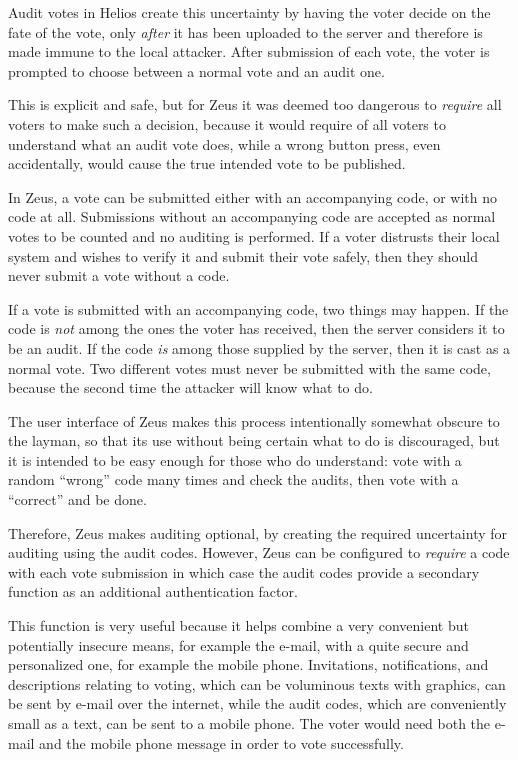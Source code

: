 \documentclass[letterpaper,10pt]{article}
\begin{document}
Audit votes in Helios create this uncertainty by having the voter decide
on the fate of the vote, only \emph{after} it has been uploaded to the
server and therefore is made immune to the local attacker.
After submission of each vote, the voter is prompted to choose
between a normal vote and an audit one.

This is explicit and safe, but for Zeus it was deemed too dangerous to
\emph{require} all voters to make such a decision, because it would
require of all voters to understand what an audit vote does,
while a wrong button press, even accidentally,
would cause the true intended vote to be published.

In Zeus, a vote can be submitted either with an accompanying code,
or with no code at all.
Submissions without an accompanying code are accepted
as normal votes to be counted and no auditing is performed.
If a voter distrusts their local system and wishes to verify it
and submit their vote safely, then they should never submit
a vote without a code.

If a vote is submitted with an accompanying code, two things may happen.
If the code is \emph{not} among the ones the voter has received, then
the server considers it to be an audit.
If the code \emph{is} among those supplied by the server,
then it is cast as a normal vote.
Two different votes must never be submitted with the same code, because
the second time the attacker will know what to do.

The user interface of Zeus makes this process intentionally somewhat
obscure to the layman, so that its use without being certain what to
do is discouraged, but it is intended to be easy enough for those who
do understand: vote with a random ``wrong'' code many times and check
the audits, then vote with a ``correct'' and be done.

Therefore, Zeus makes auditing optional, by creating the required
uncertainty for auditing using the audit codes.
However, Zeus can be configured to \emph{require} a code with each vote
submission in which case the audit codes provide a secondary function
as an additional authentication factor.

This function is very useful because it helps combine a very convenient
but potentially insecure means, for example the e-mail,
with a quite secure and personalized one, for example the mobile phone.
Invitations, notifications, and descriptions relating to voting,
which can be voluminous texts with graphics,
can be sent by e-mail over the internet,
while the audit codes, which are conveniently small as a text,
can be sent to a mobile phone.
The voter would need both the e-mail and the mobile phone message in
order to vote successfully.
\end{document}
